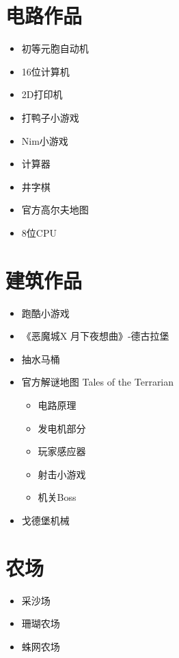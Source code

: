 \section{电路作品}
\begin{maybecols}
\begin{itemize}
\item {} 初等元胞自动机 
\item {} 16位计算机 
\item {} 2D打印机 
\item {} 打鸭子小游戏 
\item {} Nim小游戏 
\item {} 计算器 
\item {} 井字棋 
\item 官方高尔夫地图 
\item {} 8位CPU 
\end{itemize}
\end{maybecols}

\section{建筑作品}
\begin{maybecols}
\begin{itemize}
\item {} 跑酷小游戏 
\item {} 《恶魔城X 月下夜想曲》-德古拉堡 
\item {} 抽水马桶 
\item 官方解谜地图 Tales of the Terrarian 
	\begin{itemize}
	\item 电路原理 
	\item 发电机部分 
	\item 玩家感应器 
	\item 射击小游戏 
	\item 机关Boss 
	\end{itemize}
\item {} 戈德堡机械 
\end{itemize}
\end{maybecols}

\section{农场}
\begin{maybecols}
\begin{itemize}
\item {} 采沙场 
\item {} 珊瑚农场 
\item {} 蛛网农场 
\end{itemize}
\end{maybecols}

